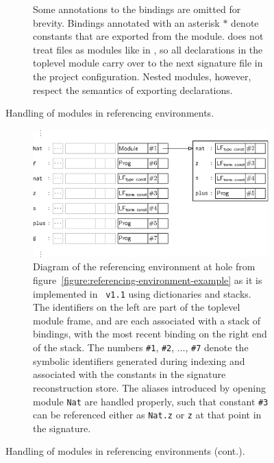 \begin{figure}[H]
\begin{subfigure}{\linewidth}
{Some annotations to the bindings are omitted for brevity.
Bindings annotated with an asterisk $*$ denote constants that are exported from the module.
\Beluga does not treat files as modules like in \OCaml, so all declarations in the toplevel module carry over to the next signature file in the project configuration.
Nested modules, however, respect the semantics of exporting declarations.
}
\label{figure:example-reference-environment-formalism}
\end{subfigure}
\caption[Handling of modules in referencing environments]{Handling of modules in referencing environments.}
\label{figure:referencing-environment-modules}
\end{figure}%
\begin{figure}\ContinuedFloat
\begin{subfigure}{\linewidth}
\includegraphics{figures/referencing-environment-implementation.eps}
\caption[]{%
Diagram of the referencing environment at hole \texttt{} from figure~\ref{figure:referencing-environment-example} as it is implemented in \Beluga~\texttt{v1.1} using dictionaries and stacks.
The identifiers on the left are part of the toplevel module frame, and are each associated with a stack of bindings, with the most recent binding on the right end of the stack.
The numbers \texttt{\#1}, \texttt{\#2}, ..., \texttt{\#7} denote the symbolic identifiers generated during indexing and associated with the constants in the signature reconstruction store.
The aliases introduced by opening module \texttt{Nat} are handled properly, such that constant \texttt{\#3} can be referenced either as \texttt{Nat.z} or \texttt{z} at that point in the signature.
}
\label{figure:referencing-environment-implementation}
\end{subfigure}
\caption[]{Handling of modules in referencing environments (cont.).}
\end{figure}

